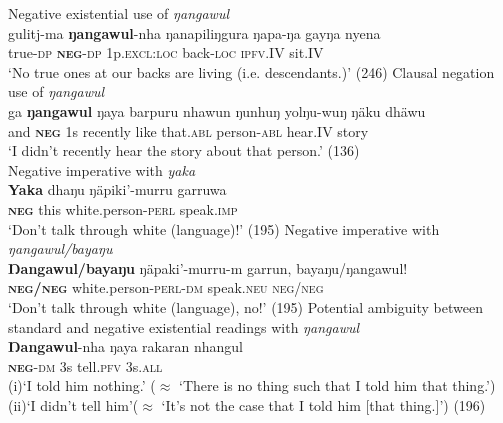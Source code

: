 \documentclass[output=paper]{langsci/langscibook}
\begin{document}
\begin{exe}\ex\label{ex:austr-wangurri-negstrat}
    \begin{xlist}
        \ex Negative existential use of {\em ŋangawul}\\
\gll gulitj-ma \textbf{ŋangawul}-nha ŋanapiliŋgura ŋapa-ŋa gayŋa nyena\\
true-\textsc{dp} \textsc{\textbf{neg}-dp} 1p\textsc{.excl:loc} back\textsc{-loc} \textsc{ipfv}.IV sit.IV\\
\glt `No true ones at our backs are living (i.e. descendants.)' \hfill (246)
%
\ex Clausal negation use of {\em ŋangawul}\\
\gll ga \textbf{ŋangawul} ŋaya barpuru nhawun ŋunhuŋ yolŋu-wuŋ ŋäku dhäwu\\
and \textsc{\textbf{neg}} 1s recently like that.\textsc{abl} person\textsc{-abl} hear\textsc{.IV} story\\
\glt  `I didn't recently hear the story about that person.' \hfill (136)\\
%
\ex Negative imperative with {\em yaka}\\
\gll \textbf{Yaka} dhaŋu ŋäpiki'-murru garruwa\\
\textsc{\textbf{neg}} this white.person-\textsc{perl} speak\textsc{.imp}\\
\glt `Don't talk through white (language)!' \hfill {(195)}
%
\ex Negative imperative with \emph{ŋangawul\slash bayaŋu}\\
\gll \textbf{Ŋangawul\slash bayaŋu} ŋäpaki'-murru-m garrun, bayaŋu/ŋangawul!\\
\textsc{\textbf{neg\slash neg}} white.person-\textsc{perl}-\textsc{dm}
        speak\textsc{.neu}\footnotemark{} \textsc{neg\slash neg}\\
\glt  `Don't talk through white (language), no!' \hfill (195)
%
\ex\label{ex:austr-wangurri-negstrat-ambig}
    Potential ambiguity between standard and negative existential readings with \emph{ŋangawul}\\
\gll \textbf{Ŋangawul}-nha ŋaya rakaran nhangul\\
\textsc{\textbf{neg}}-\textsc{dm} 3s tell.\textsc{pfv} 3s.\textsc{all}\\
\glt (i)\quad`I told him nothing.' ($\approx$ `There is no thing such that I told him that thing.')\\
(ii)\quad `I didn't tell him'($\approx$ `It's not the case that I told him [that thing.]') \hfill (196)
    \end{xlist}\end{exe}
\end{document}
